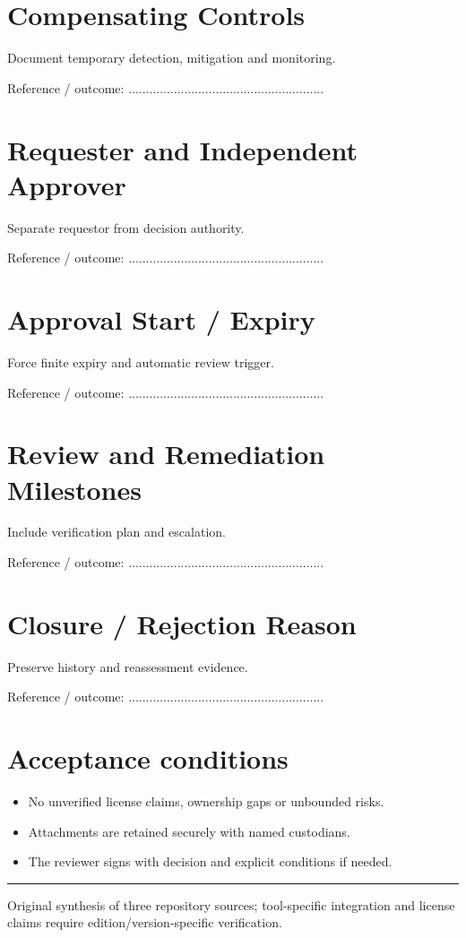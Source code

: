 \documentclass[10pt,letterpaper]{article}
\begin{document}
\section{Compensating Controls}
Document temporary detection, mitigation and monitoring.\par
Reference / outcome: ........................................................\par
\section{Requester and Independent Approver}
Separate requestor from decision authority.\par
Reference / outcome: ........................................................\par
\section{Approval Start / Expiry}
Force finite expiry and automatic review trigger.\par
Reference / outcome: ........................................................\par
\section{Review and Remediation Milestones}
Include verification plan and escalation.\par
Reference / outcome: ........................................................\par
\section{Closure / Rejection Reason}
Preserve history and reassessment evidence.\par
Reference / outcome: ........................................................\par
\section{Acceptance conditions}
\begin{itemize}
\item No unverified license claims, ownership gaps or unbounded risks.
\item Attachments are retained securely with named custodians.
\item The reviewer signs with decision and explicit conditions if needed.
\end{itemize}
\vfill\noindent\color{muted}\rule{\linewidth}{0.4pt}\par\scriptsize Original synthesis of three repository sources; tool-specific integration and license claims require edition/version-specific verification.\normalsize
\end{document}

